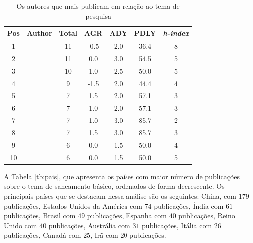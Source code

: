 \begin{table}[H]
	\centering
	\caption{Os autores que mais publicam em relação ao tema de pesquisa}\label{tb:autor}
	\begin{tabular}{ccccccc}
		\hline
		Pos & Author       & Total & AGR  & ADY  & PDLY & \textit{h-index} \\
		\hline
		1 & \citeonline{2-s2.0-84973369468} & 11 & -0.5 & 2.0 & 36.4 & 8 \\
		2 & \citeonline{2-s2.0-85123707840} & 11 & 0.0 & 3.0 & 54.5 & 5 \\
		3 & \citeonline{2-s2.0-85018469706} & 10 & 1.0 & 2.5 & 50.0 & 5 \\
		4 & \citeonline{2-s2.0-85048003524} & 9 & -1.5 & 2.0 & 44.4 & 4 \\
		5 & \citeonline{2-s2.0-84964575877} & 7 & 1.5 & 2.0 & 57.1 & 3 \\
		6 & \citeonline{2-s2.0-85063200888} & 7 & 1.0 & 2.0 & 57.1 & 3 \\
		7 & \citeonline{2-s2.0-85148656225} & 7 & 1.0 & 3.0 & 85.7 & 2 \\
		8 & \citeonline{2-s2.0-85041536076} & 7 & 1.5 & 3.0 & 85.7 & 3 \\
		9 & \citeonline{2-s2.0-85130875471} & 6 & 0.0 & 1.5 & 50.0 & 4 \\
		10 & \citeonline{2-s2.0-85061810603}& 6 & 0.0 & 1.5 & 50.0 & 5 \\
		\hline
	\end{tabular}
	
	
\end{table}


A Tabela \ref{tb:pais}, que apresenta os países com maior número de publicações sobre o tema de saneamento básico, ordenados de forma decrescente. Os principais países que se destacam nessa análise são os seguintes: China, com $179$ publicações, Estados Unidos da América com $74$ publicações, Índia com $61$ publicações, Brasil com $49$ publicações, Espanha com $40$ publicações, Reino Unido com $40$ publicações, Austrália com $31$ publicações, Itália com $26$ publicações, Canadá com $25$, Irã com $20$ publicações.

